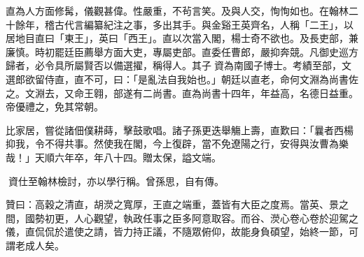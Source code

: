 \begin{pinyinscope}
直為人方面修髯，儀觀甚偉。性嚴重，不茍言笑。及與人交，恂恂如也。在翰林二十餘年，稽古代言編纂紀注之事，多出其手。與金谿王英齊名，人稱「二王」，以居地目直曰「東王」，英曰「西王」。直以次當入閣，楊士奇不欲也。及長吏部，兼廉慎。時初罷廷臣薦舉方面大吏，專屬吏部。直委任曹郎，嚴抑奔競。凡御史巡方歸者，必令具所屬賢否以備選擢，稱得人。其子資為南國子博士。考績至部，文選郎欲留侍直，直不可，曰：「是亂法自我始也。」朝廷以直老，命何文淵為尚書佐之。文淵去，又命王翱，部遂有二尚書。直為尚書十四年，年益高，名德日益重。帝優禮之，免其常朝。

比家居，嘗從諸佃僕耕蒔，擊鼓歌唱。諸子孫更迭舉觴上壽，直歎曰：「曩者西楊抑我，令不得共事。然使我在閣，今上復辟，當不免遼陽之行，安得與汝曹為樂哉！」天順六年卒，年八十四。贈太保，謚文端。

資仕至翰林檢討，亦以學行稱。曾孫思，自有傳。

贊曰：高穀之清直，胡濙之寬厚，王直之端重，蓋皆有大臣之度焉。當英、景之間，國勢初更，人心觀望，執政任事之臣多阿意取容。而谷、濙心卷心卷於迎駕之儀，直侃侃於遣使之請，皆力持正議，不隨眾俯仰，故能身負碩望，始終一節，可謂老成人矣。


\end{pinyinscope}